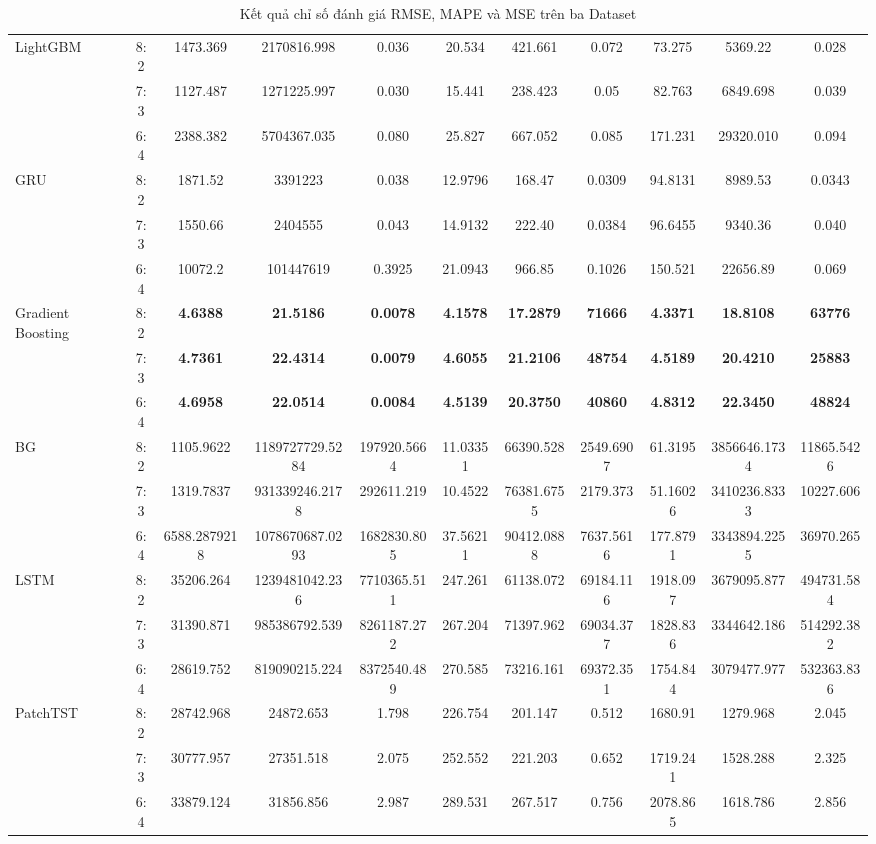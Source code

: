 \documentclass[conference]{IEEEtran}
\begin{document}
\begin{table}[H]
\begin{tabular}{|l|c||c||c||c||c||c||c||c||c||c|}
\hline
LightGBM & 8:2 & 1473.369 & 2170816.998 & 0.036 & 20.534 & 421.661 & 0.072 & 73.275 & 5369.22 & 0.028  \\
    & 7:3 & 1127.487 & 1271225.997 & 0.030 & 15.441 & 238.423 & 0.05 & 82.763 & 6849.698 & 0.039  \\
    & 6:4 & 2388.382 & 5704367.035 & 0.080 & 25.827 & 667.052 & 0.085 & 171.231 & 29320.010 & 0.094  \\
\hline
GRU & 8:2 &1871.52  &3391223  &0.038 &12.9796 &168.47 &0.0309 &94.8131 &8989.53 &0.0343 \\
    & 7:3 &1550.66  &2404555  &0.043 &14.9132 &222.40 &0.0384 &96.6455 &9340.36 &0.040 \\
    & 6:4 &10072.2  &101447619  &0.3925 &21.0943 &966.85 &0.1026 &150.521 &22656.89 &0.069 \\
\hline
Gradient Boosting & 8:2 & \textbf{4.6388}  & \textbf{21.5186}  & \textbf{0.0078} & \textbf{4.1578} & \textbf{17.2879} & \textbf{71666} & \textbf{4.3371} & \textbf{18.8108} & \textbf{63776} \\
    & 7:3 & \textbf{4.7361}  & \textbf{22.4314}  & \textbf{0.0079} & \textbf{4.6055} & \textbf{21.2106} & \textbf{48754} & \textbf{4.5189} & \textbf{20.4210} & \textbf{25883} \\
    & 6:4 & \textbf{4.6958}  & \textbf{22.0514}  & \textbf{0.0084} & \textbf{4.5139} & \textbf{20.3750} & \textbf{40860} & \textbf{4.8312} & \textbf{22.3450} & \textbf{48824} \\
\hline
BG & 8:2 & 1105.9622 & 1189727729.5284 & 197920.5664 & 11.03351 &66390.528 &  2549.6907 &  61.3195 & 3856646.1734 & 11865.5426\\
    & 7:3 &  1319.7837 & 931339246.2178 & 292611.219 &  10.4522 & 76381.6755 & 2179.373 & 51.16026 & 3410236.8333 & 10227.606 \\
    & 6:4 & 6588.2879218 & 1078670687.0293 & 1682830.805 & 37.56211 & 90412.0888 & 7637.5616 & 177.8791 & 3343894.2255 & 36970.265 \\
\hline
LSTM & 8:2 & 35206.264 & 1239481042.236 & 7710365.511 & 247.261 & 61138.072 & 69184.116 & 1918.097 & 3679095.877 & 494731.584    \\
    & 7:3 & 31390.871 & 985386792.539 & 8261187.272 & 267.204 & 71397.962 & 69034.377 & 1828.836 & 3344642.186 & 514292.382   \\
    & 6:4 & 28619.752 & 819090215.224 & 8372540.489 & 270.585 & 73216.161 & 69372.351 & 1754.844 & 3079477.977 & 532363.836   \\
\hline
PatchTST & 8:2 & 28742.968 & 24872.653 & 1.798 & 226.754 & 201.147 & 0.512 & 1680.91 & 1279.968 & 2.045 \\
    & 7:3 & 30777.957 & 27351.518 & 2.075 & 252.552 & 221.203 & 0.652 & 1719.241 & 1528.288 & 2.325 \\
    & 6:4 & 33879.124 & 31856.856 & 2.987 & 289.531 & 267.517 & 0.756 & 2078.865 & 1618.786 & 2.856 \\
\hline
\end{tabular}
\caption{Kết quả chỉ số đánh giá RMSE, MAPE và MSE trên ba Dataset}
\end{table}    
\clearpage
\end{document}
